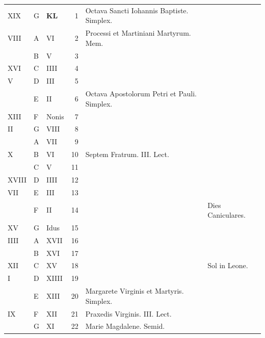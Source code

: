 \documentclass[11pt,openany]{book}
\begin{document}
\begin{center}
\begin{tabular}{l | l | l | r | l l}
\color{Red} XIX & G & \textbf{\color{Red} K\color{Blue}L} & 1 & Octava Sancti Iohannis Baptiste. Simplex. & \color{Red} \\
\color{Red} VIII & \color{Red} A & \color{Red} VI & 2 & Processi et Martiniani Martyrum. Mem. & \color{Red} \\
\color{Red}  & B & \color{Red} V & 3 & & \color{Red} \\
\color{Red} XVI & C & \color{Red} IIII & 4 & & \color{Red} \\
\color{Red} V & D & \color{Red} III & 5 & & \color{Red} \\
\color{Red}  & E & \color{Red} II & 6 & \color{Red} Octava Apostolorum Petri et Pauli. Simplex. \\
\color{Red} XIII & F & \color{Red} Nonis & 7 & & \color{Red} \\
\color{Red} II & G & \color{Red} VIII & 8 & & \color{Red} \\
\color{Red}  & \color{Red} A & \color{Red} VII & 9 & & \color{Red} \\
\color{Red} X & B & \color{Red} VI & 10 & Septem Fratrum. III. Lect. & \color{Red} \\
\color{Red}  & C & \color{Red} V & 11 & & \color{Red} \\
\color{Red} XVIII & D & \color{Red} IIII & 12 &  & \color{Red} \\
\color{Red} VII & E & \color{Red} III & 13 & & \color{Red} \\
\color{Red}  & F & \color{Red} II & 14 & & \color{Red} Dies Caniculares. \\
\color{Red} XV & G & \color{Red} Idus & 15 & & \color{Red} \\
\color{Red} IIII & \color{Red} A & \color{Red} XVII & 16 & \\
\color{Red}  & B & \color{Red} XVI & 17 & & \color{Red} \\
\color{Red} XII & C & \color{Red} XV & 18 & & \color{Red} Sol in Leone. \\
\color{Red} I & D & \color{Red} XIIII & 19 & & \color{Red} \\
\color{Red}  & E & \color{Red} XIII & 20 & Margarete Virginis et Martyris. Simplex. & \color{Red} \\
\color{Red} IX & F & \color{Red} XII & 21 & Praxedis Virginis. III. Lect. & \color{Red} \\
\color{Red}  & G & \color{Red} XI & 22 & \color{Red} Marie Magdalene. Semid. \\

\end{tabular}
\end{center}
\end{document}
